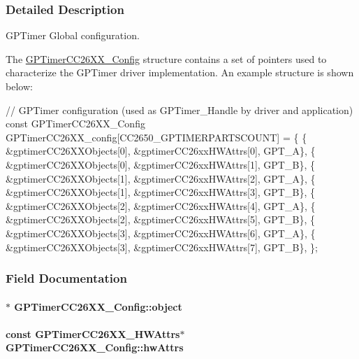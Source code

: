\subsubsection{Detailed Description}
G\+P\+Timer Global configuration. 

The \hyperlink{struct_g_p_timer_c_c26_x_x___config}{G\+P\+Timer\+C\+C26\+X\+X\+\_\+\+Config} structure contains a set of pointers used to characterize the G\+P\+Timer driver implementation. An example structure is shown below\+: 
\begin{DoxyCode}
\textcolor{comment}{// GPTimer configuration (used as GPTimer\_Handle by driver and application)}
\textcolor{keyword}{const} GPTimerCC26XX_Config GPTimerCC26XX\_config[CC2650\_GPTIMERPARTSCOUNT] = \{
  \{ &gptimerCC26XXObjects[0], &gptimerCC26xxHWAttrs[0], GPT_A\},
  \{ &gptimerCC26XXObjects[0], &gptimerCC26xxHWAttrs[1], GPT_B\},
  \{ &gptimerCC26XXObjects[1], &gptimerCC26xxHWAttrs[2], GPT_A\},
  \{ &gptimerCC26XXObjects[1], &gptimerCC26xxHWAttrs[3], GPT_B\},
  \{ &gptimerCC26XXObjects[2], &gptimerCC26xxHWAttrs[4], GPT_A\},
  \{ &gptimerCC26XXObjects[2], &gptimerCC26xxHWAttrs[5], GPT_B\},
  \{ &gptimerCC26XXObjects[3], &gptimerCC26xxHWAttrs[6], GPT_A\},
  \{ &gptimerCC26XXObjects[3], &gptimerCC26xxHWAttrs[7], GPT_B\},
\};
\end{DoxyCode}
 

\subsubsection{Field Documentation}
\paragraph[{object}]{$\ast$ G\+P\+Timer\+C\+C26\+X\+X\+\_\+\+Config\+::object}\label{struct_g_p_timer_c_c26_x_x___config_a92658b3b494f165b96a8bb7324ffb737}
\paragraph[{hw\+Attrs}]{\setlength{\rightskip}{0pt plus 5cm}const {\bf G\+P\+Timer\+C\+C26\+X\+X\+\_\+\+H\+W\+Attrs}$\ast$ G\+P\+Timer\+C\+C26\+X\+X\+\_\+\+Config\+::hw\+Attrs}\label{struct_g_p_timer_c_c26_x_x___config_a713a6a23b178957ab2f245326f954b2b}
